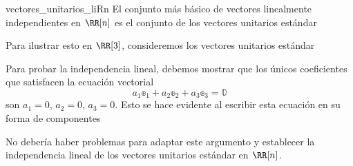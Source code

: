 \newpage

\begin{examplebox}{}{vectores_unitarios_liRn}
    El conjunto más básico de vectores linealmente independientes en $\RR[n]$ es el conjunto de los vectores unitarios estándar
    \begin{matrizn}
    \end{matrizn}
    Para ilustrar esto en $\RR[3]$, consideremos los vectores unitarios estándar
    \begin{matrizn}
    \end{matrizn}
    Para probar la independencia lineal, debemos mostrar que los únicos coeficientes que satisfacen la ecuación vectorial
    $$a_1\mathbb{e}_1 + a_2\mathbb{e}_2 + a_3\mathbb{e}_3 = \mathbb{0}$$
    son $a_1 = 0$, $a_2 = 0$, $a_3 = 0$. Esto se hace evidente al escribir esta ecuación en su forma de componentes
    \begin{matrizn}
    \end{matrizn}
    No debería haber problemas para adaptar este argumento y establecer la independencia lineal de los vectores unitarios estándar en $\RR[n]$.
\end{examplebox}


